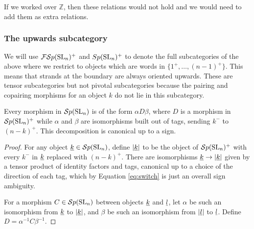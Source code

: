 \documentclass[11pt,leqno]{article}
\begin{document}
\begin{rem}
If we worked over $ \mathbb Z$, then these relations would not hold and we would need to add them as extra relations.
\end{rem}


\subsubsection{The upwards subcategory}
We will use ${\mathcal{FS}p}({\rm{SL}}_n)^+$ and $Sp({\rm{SL}}_n)^+$ to denote the full subcategories of the above where we restrict to objects which are words in $\{1^+,\ldots,(n-1)^+\}$. This means that strands at the boundary are always oriented upwards. These are tensor subcategories but not pivotal subcategories because the pairing and copairing morphisms for an object $k$ do not lie in this subcategory.

\begin{lem}
Every morphism in ${\mathcal{S}p}({\rm{SL}}_n)$ is of the form $\alpha D \beta$, where $D$ is a morphism in ${\mathcal{S}p}({\rm{SL}}_n)^+$ while $\alpha$ and $\beta$ are isomorphisms built out of tags, sending $k^-$ to $(n-k)^+$.  This decomposition is canonical up to a sign.
\end{lem}
\begin{proof}
For any object ${\underline{k}} \in {\mathcal{S}p}({\rm{SL}}_n)$, define $\left|{\underline{k}}\right|$ to be the object of ${\mathcal{S}p}({\rm{SL}}_n)^+$ with every $k^-$ in ${\underline{k}}$ replaced with $(n-k)^+$. There are isomorphisms ${\underline{k}} \to \left|{\underline{k}}\right|$ given by a tensor product of identity factors and tags, canonical up to a choice of the direction of each tag, which by Equation \eqref{eq:switch} is just an overall sign ambiguity.

For a morphism $C \in {\mathcal{S}p}({\rm{SL}}_n)$ between objects ${\underline{k}}$ and ${\underline{l}}$, let $\alpha$ be such an isomorphism from ${\underline{k}}$ to $\left|{\underline{k}}\right|$, and $\beta$ be such an isomorphism from $\left|{\underline{l}}\right|$ to ${\underline{l}}$. Define $D = \alpha^{-1} C \beta^{-1}$.

\end{proof}
\end{document}
